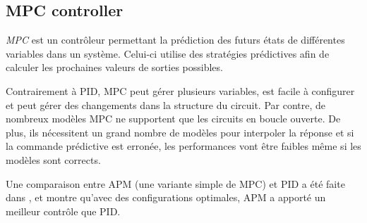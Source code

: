\subsection{MPC controller}
\emph{MPC} est un contrôleur permettant la prédiction des futurs états de différentes variables dans un système.
Celui-ci utilise des stratégies prédictives afin de calculer les prochaines valeurs de sorties possibles.

Contrairement à PID, MPC peut gérer plusieurs variables, est facile à configurer et peut gérer des changements dans la structure du circuit.
Par contre, de nombreux modèles MPC ne supportent que les circuits en boucle ouverte.
De plus, ils nécessitent un grand nombre de modèles pour interpoler la réponse et si la commande prédictive est erronée, les performances vont être faibles même si les modèles sont corrects.

Une comparaison entre APM (une variante simple de MPC) et PID a été faite dans \cite{saletovic2014apm}, et montre qu'avec des configurations optimales, APM a apporté un meilleur contrôle que PID.

